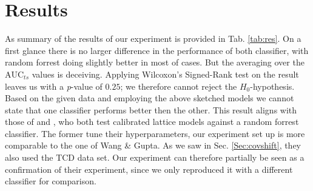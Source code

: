 \section{Results}\label{Sec:Results}

As summary of the results of our experiment is provided in Tab. \ref{tab:res}. On a first glance there is no larger difference in the performance of both classifier, with random forrest doing slightly better in most of cases. But the averaging over the $\mathrm{AUC}_{ts}$ values is deceiving. Applying Wilcoxon's Signed-Rank test on the result leaves us with a \textit{p}-value of $0.25$; we therefore cannot reject the $H_0$-hypothesis. Based on the given data and employing the above sketched models we cannot state that one classifier performs better then the other. This result aligns with those of \citep[Sec.~10]{gupta2016monotonic} and \citep[Sec.~8]{wang2020deontological}, who both test calibrated lattice models against a random forrest classifier. The former tune their hyperparameters, our experiment set up is more comparable to the one of Wang \& Gupta. As we saw in Sec. \ref{Sec:covshift}, they also used the TCD data set. Our experiment can therefore partially be seen as a confirmation of their experiment, since we only reproduced it with a different classifier for comparison. \medskip

